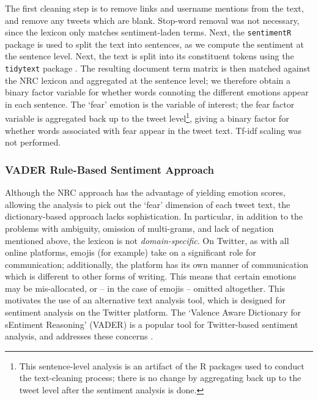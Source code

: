 \documentclass{article}
\begin{document}
The first cleaning step is to remove links and username mentions from the text, and remove any tweets which are blank. Stop-word removal was not necessary, since the lexicon only matches sentiment-laden terms. Next, the \texttt{sentimentR} package \parencite{rinkerSentimentr2018} is used to split the text into sentences, as we compute the sentiment at the sentence level. Next, the text is split into its constituent tokens using the \texttt{tidytext} package \parencite{silgeTextMiningTidy2017}. The resulting document term matrix is then matched against the NRC lexicon and aggregated at the sentence level; we therefore obtain a binary factor variable for whether words connoting the different emotions appear in each sentence. The `fear' emotion is the variable of interest; the fear factor variable is aggregated back up to the tweet level\footnote{This sentence-level analysis is an artifact of the R packages used to conduct the text-cleaning process; there is no change by aggregating back up to the tweet level after the sentiment analysis is done.}, giving a binary factor for whether words associated with fear appear in the tweet text.  Tf-idf scaling was not performed.

\subsubsection{VADER Rule-Based Sentiment Approach}\label{vader}
Although the NRC approach has the advantage of yielding emotion scores, allowing the analysis to pick out the `fear' dimension of each tweet text, the dictionary-based approach lacks sophistication. In particular, in addition to the problems with ambiguity, omission of multi-grams, and lack of negation mentioned above, the lexicon is not \textit{domain-specific}. On Twitter, as with all online platforms, emojis (for example) take on a significant role for communication; additionally, the platform has its own manner of communication which is different to other forms of writing. This means that certain emotions may be mis-allocated, or -- in the case of emojis -- omitted altogether. This motivates the use of an alternative text analysis tool, which is designed for sentiment analysis on the Twitter platform. The `Valence Aware Dictionary for sEntiment Reasoning' (VADER) is a popular tool for Twitter-based sentiment analysis, and addresses these concerns \parencite{huttoVaderParsimoniousRulebased2014}.
\end{document}
